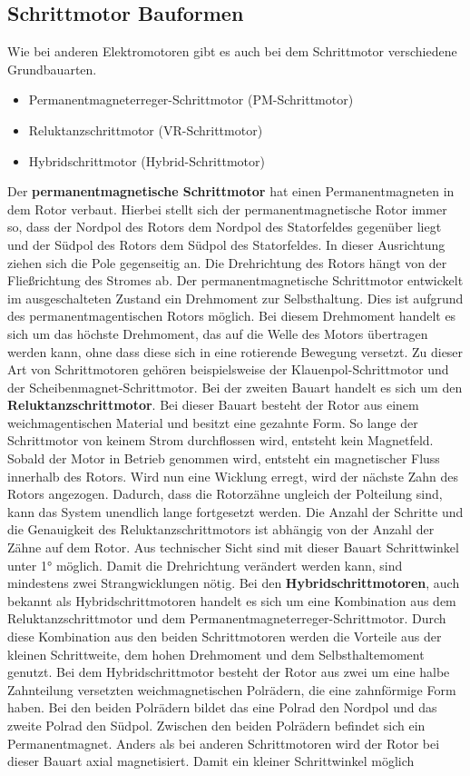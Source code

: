 \subsection{Schrittmotor Bauformen}

Wie bei anderen Elektromotoren gibt es auch bei dem Schrittmotor verschiedene Grundbauarten. 

\begin{itemize}
	\item {Permanentmagneterreger-Schrittmotor (PM-Schrittmotor)}
	\item {Reluktanzschrittmotor (VR-Schrittmotor)}
	\item {Hybridschrittmotor (Hybrid-Schrittmotor)}
\end{itemize}

Der \textbf{permanentmagnetische Schrittmotor} hat einen Permanentmagneten in dem Rotor verbaut. Hierbei stellt sich der permanentmagnetische Rotor immer so, dass der Nordpol des Rotors dem Nordpol des Statorfeldes gegenüber liegt und der Südpol des Rotors dem Südpol des Statorfeldes. In dieser Ausrichtung ziehen sich die Pole gegenseitig an. Die Drehrichtung des Rotors hängt von der Fließrichtung des Stromes ab. Der permanentmagnetische Schrittmotor entwickelt im ausgeschalteten Zustand ein Drehmoment zur Selbsthaltung. Dies ist aufgrund des permanentmagentischen Rotors möglich. Bei diesem Drehmoment handelt es sich um das höchste Drehmoment, das auf die Welle des Motors übertragen werden kann, ohne dass diese sich in eine rotierende Bewegung versetzt. Zu dieser Art von Schrittmotoren gehören beispielsweise der Klauenpol-Schrittmotor und der Scheibenmagnet-Schrittmotor. Bei der zweiten Bauart handelt es sich um den \textbf{Reluktanzschrittmotor}. Bei dieser Bauart besteht der Rotor aus einem weichmagentischen Material und besitzt eine gezahnte Form. So lange der Schrittmotor von keinem Strom durchflossen wird, entsteht kein Magnetfeld. Sobald der Motor in Betrieb genommen wird, entsteht ein magnetischer Fluss innerhalb des Rotors. Wird nun eine Wicklung erregt, wird der nächste Zahn des Rotors angezogen. Dadurch, dass die Rotorzähne ungleich der Polteilung sind, kann das System unendlich lange fortgesetzt werden. Die Anzahl der Schritte und die Genauigkeit des Reluktanzschrittmotors ist abhängig von der Anzahl der Zähne auf dem Rotor. Aus technischer Sicht sind mit dieser Bauart Schrittwinkel unter 1° möglich. Damit die Drehrichtung verändert werden kann, sind mindestens zwei Strangwicklungen nötig. Bei den \textbf{Hybridschrittmotoren}, auch bekannt als Hybridschrittmotoren handelt es sich um eine Kombination aus dem Reluktanzschrittmotor und dem Permanentmagneterreger-Schrittmotor. Durch diese Kombination aus den beiden Schrittmotoren werden die Vorteile aus der kleinen Schrittweite, dem hohen Drehmoment und dem Selbsthaltemoment genutzt. Bei dem Hybridschrittmotor besteht der Rotor aus zwei um eine halbe Zahnteilung versetzten weichmagnetischen Polrädern, die eine zahnförmige Form haben. Bei den beiden Polrädern bildet das eine Polrad den Nordpol und das zweite Polrad den Südpol. Zwischen den beiden Polrädern befindet sich ein Permanentmagnet. Anders als bei anderen Schrittmotoren wird der Rotor bei dieser Bauart axial magnetisiert. Damit ein kleiner Schrittwinkel möglich 